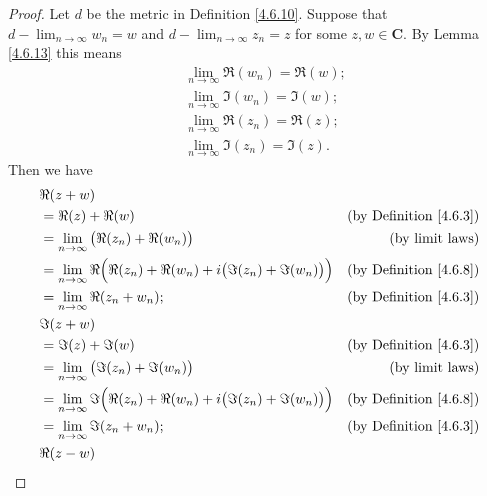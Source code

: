 \begin{proof}
    Let \(d\) be the metric in Definition \ref{4.6.10}.
    Suppose that \(d - \lim_{n \to \infty} w_n = w\) and \(d - \lim_{n \to \infty} z_n = z\) for some \(z, w \in \mathbf{C}\).
    By Lemma \ref{4.6.13} this means
    \begin{align*}
         & \lim_{n \to \infty} \Re(w_n) = \Re(w); \\
         & \lim_{n \to \infty} \Im(w_n) = \Im(w); \\
         & \lim_{n \to \infty} \Re(z_n) = \Re(z); \\
         & \lim_{n \to \infty} \Im(z_n) = \Im(z).
    \end{align*}
    Then we have
    \begin{align*}
         & \Re(z + w)                                                                                                                    \\
         & = \Re(z) + \Re(w)                                                                        & \text{(by Definition \ref{4.6.3})} \\
         & = \lim_{n \to \infty} \big(\Re(z_n) + \Re(w_n)\big)                                      & \text{(by limit laws)}             \\
         & = \lim_{n \to \infty} \Re\Big(\Re(z_n) + \Re(w_n) + i \big(\Im(z_n) + \Im(w_n)\big)\Big) & \text{(by Definition \ref{4.6.8})} \\
         & = \lim_{n \to \infty} \Re(z_n + w_n);                                                    & \text{(by Definition \ref{4.6.3})} \\
         & \Im(z + w)                                                                                                                    \\
         & = \Im(z) + \Im(w)                                                                        & \text{(by Definition \ref{4.6.3})} \\
         & = \lim_{n \to \infty} \big(\Im(z_n) + \Im(w_n)\big)                                      & \text{(by limit laws)}             \\
         & = \lim_{n \to \infty} \Im\Big(\Re(z_n) + \Re(w_n) + i \big(\Im(z_n) + \Im(w_n)\big)\Big) & \text{(by Definition \ref{4.6.8})} \\
         & = \lim_{n \to \infty} \Im(z_n + w_n);                                                    & \text{(by Definition \ref{4.6.3})} \\
         & \Re(z - w)                                                                                                                    \\

\end{align*}
\end{proof}

